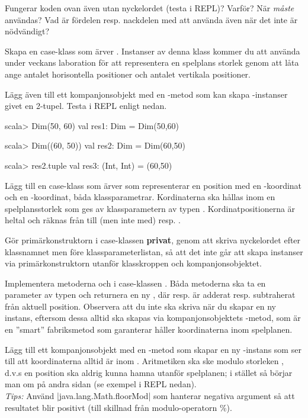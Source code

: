 \Subtask Fungerar koden ovan även utan nyckelordet  (testa i REPL)? Varför? När \emph{måste}  användas? Vad är fördelen resp. nackdelen med att använda  även när det inte är nödvändigt? 

\Subtask Skapa en case-klass  som ärver . Instanser av denna klass kommer du att använda under veckans laboration för att representera en spelplans storlek genom att låta  ange antalet horisontella positioner och  antalet vertikala positioner.

Lägg även till ett kompanjonsobjekt  med en -metod som kan skapa -instanser givet en 2-tupel.
Testa i REPL enligt nedan.
\begin{REPLnonum}
scala> Dim(50, 60)
val res1: Dim = Dim(50,60)

scala> Dim((60, 50))
val res2: Dim = Dim(60,50)

scala> res2.tuple
val res3: (Int, Int) = (60,50)
\end{REPLnonum}

\Subtask Lägg till en case-klass  som ärver  som representerar en position med en -koordinat och en -koordinat, båda klassparametrar. Kordinaterna ska hållas inom en spelplansstorlek som ges av klassparametern  av typen . Kordinatpositionerna är heltal och räknas från  till (men inte med)  resp. .

Gör primärkonstruktorn i case-klassen  \textbf{privat}, genom att skriva nyckelordet  efter klassnamnet men före klassparameterlistan, så att det inte går att skapa instanser via primärkonstruktorn utanför klasskroppen och kompanjonsobjektet. 

Implementera metoderna \code{+} och \code{-} i case-klassen . Båda metoderna ska ta en parameter  av typen  och returnera en ny , där  resp.  är adderat resp. subtraherat från aktuell position. Observera att du inte ska skriva  när du skapar en ny instans, eftersom dessa alltid ska skapas via kompanjonsobjektets -metod, som är en ''smart'' fabriksmetod som garanterar håller koordinaterna inom spelplanen. 

Lägg till ett kompanjonsobjekt  med en -metod som skapar en ny -instans som ser till att koordinaterna alltid är inom . Aritmetiken ska ske modulo storleken , d.v.s en position ska aldrig kunna hamna utanför spelplanen; i stället så börjar man om på andra sidan (se exempel i REPL nedan). \\ \emph{Tips:} Använd  \code|java.lang.Math.floorMod| som hanterar negativa argument så att resultatet blir positivt (till skillnad från modulo-operatorn \%).

